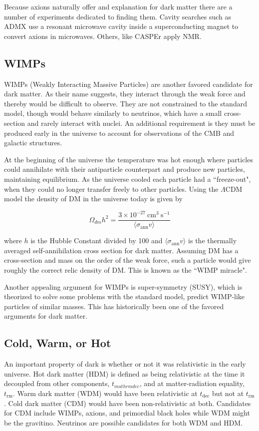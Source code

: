 Because axions naturally offer and explanation for dark matter there are a number of experiments dedicated to
finding them.  Cavity searches such as ADMX use a resonant microwave cavity inside a superconducting magnet
to convert axions in microwaves.  Others, like CASPEr apply NMR.


\subsection{WIMPs} \label{subsec:wimps}
WIMPs (Weakly Interacting Massive Particles) are another favored candidate for dark matter.  As their name
suggests, they interact through the weak force and thereby would be difficult to observe.  They
are not constrained to the standard model, though would behave similarly
to neutrinos, which have a small cross-section and rarely interact with nuclei.  An additional requirement
is they must be produced early in the universe to account for observations of the CMB and galactic
structures.

At the beginning of the universe the temperature was hot enough where particles could annihilate with their
antiparticle counterpart and produce new particles, maintaining equilibrium.  As the universe cooled each
particle had a ``freeze-out", when they could no longer transfer freely to other particles.  Using the
$\Lambda$CDM model the density of DM in the universe today is given by

\begin{equation}
\Omega_{dm}h^{2} = \frac{3 \times 10^{-27}\ \mathrm{cm^{3}\ s^{-1}}}{\langle \sigma_{\mathrm{ann}} v \rangle}
\end{equation}

\noindent where $h$ is the Hubble Constant divided by 100 and $\langle \sigma_{\mathrm{ann}} v \rangle$ is
the thermally averaged self-annihilation cross section
for dark matter.  Assuming DM has a cross-section and mass on the order of the weak force, such a
particle would give roughly the correct relic density of DM.  This is known as the ``WIMP miracle".

Another appealing argument for WIMPs is super-symmetry (SUSY), which is theorized to solve some problems
with the standard model,
predict WIMP-like particles of similar masses.  This has historically been one of the favored arguments
for dark matter.

\subsection{Cold, Warm, or Hot} \label{subsec:hot_vs_cold}
An important property of dark is whether or not it was relativistic in the early universe.  Hot dark matter (HDM)
is defined as being relativistic at the time it decoupled from other components, $t_{mathrm{dec}}$, and at
matter-radiation equality, $t_{\mathrm{rm}}$.  Warm dark matter (WDM) would have been relativistic at $t_{\mathrm{dec}}$
but not at $t_{\mathrm{rm}}$.  Cold dark matter (CDM) would have been non-relativistic at both.  Candidates for CDM include
WIMPs, axions, and primordial black holes while WDM might be the gravitino.  Neutrinos are possible candidates for both
WDM and HDM.

